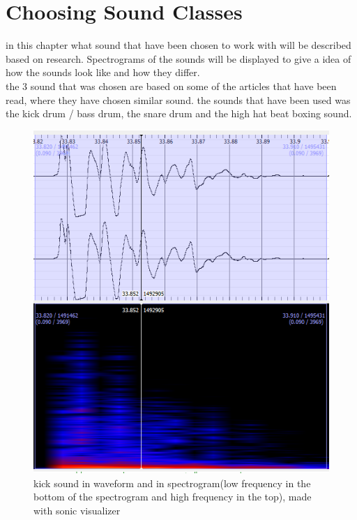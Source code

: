 \section{Choosing Sound Classes}
in this chapter what sound that have been chosen to work with will be described based on research. Spectrograms of the sounds will be displayed to give a idea of how the sounds look like and how they differ.\\
the 3 sound that was chosen are based on some of the articles that have been read, where they have chosen similar sound\citep{Stowell2010}\citep{QBBB}. the sounds that have been used was the kick drum / bass drum, the snare drum and the high hat beat boxing sound.\\
\begin{figure}[h]
	\begin{center}
		\includegraphics[scale = 0.5]{fig/Kick-closeup-with-spectrogram.png}
		\caption{kick sound in waveform and in spectrogram(low frequency in the bottom of the spectrogram and high frequency in the top), made with sonic visualizer}
		\label{KickCloseup}
	\end{center}
\end{figure} 
